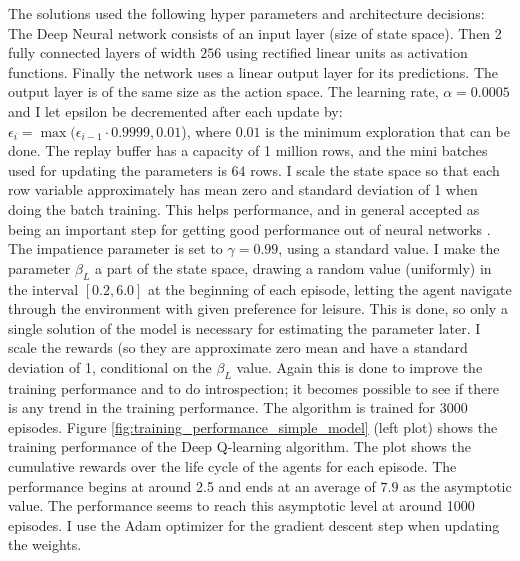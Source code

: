 The solutions used the following hyper parameters and architecture decisions: The Deep Neural network consists of an input layer (size of state space). Then  2 fully connected layers of width $256$ using rectified linear units as activation functions. Finally the network uses a linear output layer for its predictions. The output layer is of the same size as the action space. The learning rate, $\alpha=0.0005$ and I let epsilon be decremented after each update by: $\epsilon_i = \max (\epsilon_{i-1} \cdot 0.9999, 0.01$), where $0.01$ is the minimum exploration that can be done. The replay buffer has a capacity of 1 million rows, and the mini batches used for updating the parameters is $64$ rows. I scale the state space so that each row variable approximately has mean zero and standard deviation of 1 when doing the batch training. This helps performance, and in general accepted as being an important step for getting good performance out of neural networks \parencite{goodfellow_deep_2016}. The impatience parameter is set to $\gamma=0.99$, using a standard value. I make the parameter $\beta_L$ a part of the state space, drawing a random value (uniformly) in the interval $[0.2, 6.0]$ at the beginning of each episode, letting the agent navigate through the environment with given preference for leisure. This is done, so only a single solution of the model is necessary for estimating the parameter later. I scale the rewards (so they are approximate zero mean and have a standard deviation of 1, conditional on the $\beta_L$ value. Again this is done to improve the training performance and to do introspection; it becomes possible to see if there is any trend in the training performance. The algorithm is trained for 3000 episodes. Figure \ref{fig:training_performance_simple_model}  (left plot) shows the training performance of the Deep Q-learning algorithm. The plot shows the cumulative rewards over the life cycle of the agents for each episode. The performance begins at around 2.5 and ends at an average of $7.9$ as the asymptotic value. The performance seems to reach this asymptotic level at around 1000 episodes. I use the Adam optimizer for the gradient descent step when updating the weights.

